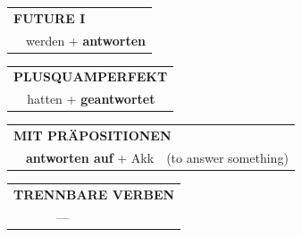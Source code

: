 \documentclass[10pt,a4paper]{revtex4-2}
\begin{document}
\begin{verbbox-dat}
\begin{tabular}{rl}
    \multicolumn{2}{l}{\textbf{FUTURE I} }\\
   & werden + \textbf{antworten}\\
 
  \end{tabular}
\hfill
   \begin{tabular}{rl}
      \multicolumn{2}{l}{\textbf{PLUSQUAMPERFEKT}}\\
   & hatten + \textbf{geantwortet}\\
  \end{tabular}


    \vspace{10pt}

\begin{tabular}{lll}
\multicolumn{3}{l}{\textbf{MIT PRÄPOSITIONEN}}\\
& \textbf{antworten auf} + Akk & (to answer something)\\
\end{tabular}
  \hfill
\begin{tabular}{lll}
\multicolumn{3}{l}{\textbf{TRENNBARE VERBEN}}\\
& ---\\
\end{tabular}

  \vspace{-5pt}

\end{verbbox-dat}
\end{document}
